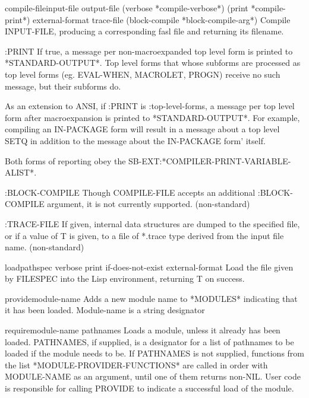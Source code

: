 \documentclass[10pt,english]{book}
\begin{document}
\begin{function}{compile-file}{input-file \key output-file (verbose *compile-verbose*)
 (print *compile-print*) external-format trace-file
 (block-compile *block-compile-arg*)}
  Compile INPUT-FILE, producing a corresponding fasl file and
returning its filename.

  :PRINT
     If true, a message per non-macroexpanded top level form is printed
     to *STANDARD-OUTPUT*. Top level forms that whose subforms are
     processed as top level forms (eg. EVAL-WHEN, MACROLET, PROGN) receive
     no such message, but their subforms do.

     As an extension to ANSI, if :PRINT is :top-level-forms, a message
     per top level form after macroexpansion is printed to *STANDARD-OUTPUT*.
     For example, compiling an IN-PACKAGE form will result in a message about
     a top level SETQ in addition to the message about the IN-PACKAGE form'
     itself.

     Both forms of reporting obey the SB-EXT:*COMPILER-PRINT-VARIABLE-ALIST*.

  :BLOCK-COMPILE
     Though COMPILE-FILE accepts an additional :BLOCK-COMPILE
     argument, it is not currently supported. (non-standard)

  :TRACE-FILE
     If given, internal data structures are dumped to the specified
     file, or if a value of T is given, to a file of *.trace type
     derived from the input file name. (non-standard)
\end{function}

\begin{function}{load}{pathspec \key verbose print if-does-not-exist external-format}
  Load the file given by FILESPEC into the Lisp environment, returning
   T on success.
\end{function}

\begin{function}{provide}{module-name}
  Adds a new module name to *MODULES* indicating that it has been loaded.
   Module-name is a string designator
\end{function}

\begin{function}{require}{module-name \op pathnames}
  Loads a module, unless it already has been loaded. PATHNAMES, if supplied,
   is a designator for a list of pathnames to be loaded if the module
   needs to be. If PATHNAMES is not supplied, functions from the list
   *MODULE-PROVIDER-FUNCTIONS* are called in order with MODULE-NAME
   as an argument, until one of them returns non-NIL.  User code is
   responsible for calling PROVIDE to indicate a successful load of the
   module.
\end{function}
\end{document}
